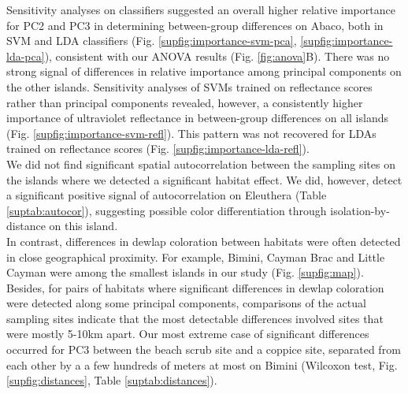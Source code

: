 Sensitivity analyses on classifiers suggested an overall higher relative importance for PC2 and PC3 in determining between-group differences on Abaco, both in SVM and LDA classifiers (Fig. \ref{supfig:importance-svm-pca}, \ref{supfig:importance-lda-pca}), consistent with our ANOVA results (Fig. \ref{fig:anova}B). There was no strong signal of differences in relative importance among principal components on the other islands. Sensitivity analyses of SVMs trained on reflectance scores rather than principal components revealed, however, a consistently higher importance of ultraviolet reflectance in between-group differences on all islands (Fig. \ref{supfig:importance-svm-refl}). This pattern was not recovered for LDAs trained on reflectance scores (Fig. \ref{supfig:importance-lda-refl}).\\


We did not find significant spatial autocorrelation between the sampling sites on the islands where we detected a significant habitat effect. We did, however, detect a significant positive signal of autocorrelation on Eleuthera (Table \ref{suptab:autocor}), suggesting possible color differentiation through isolation-by-distance on this island.\\

In contrast, differences in dewlap coloration between habitats were often detected in close geographical proximity. For example, Bimini, Cayman Brac and Little Cayman were among the smallest islands in our study (Fig. \ref{supfig:map}). Besides, for pairs of habitats where significant differences in dewlap coloration were detected along some principal components, comparisons of the actual sampling sites indicate that the most detectable differences involved sites that were mostly 5-10km apart. Our most extreme case of significant differences occurred for PC3 between the beach scrub site and a coppice site, separated from each other by a a few hundreds of meters at most on Bimini (Wilcoxon test, Fig. \ref{supfig:distances}, Table \ref{suptab:distances}).\\


